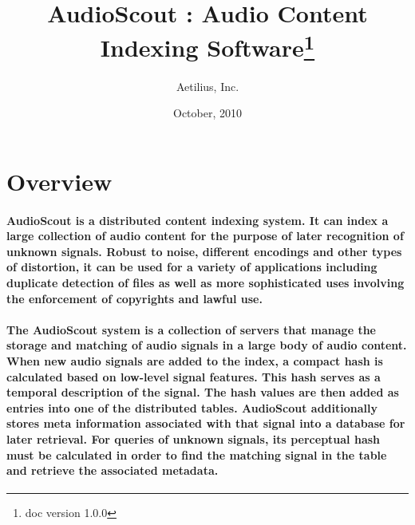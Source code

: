 \documentclass[11pt, a4paper]{article}
\title{AudioScout\texttrademark{} : Audio Content Indexing Software\footnote{doc version 1.0.0}}
\author{Aetilius, Inc.}
\date{October, 2010}
\begin{document}
\maketitle

\section{Overview}
\paragraph{AudioScout\texttrademark{} is a distributed content indexing system. It can index a
large collection of audio content for the purpose of later recognition of unknown signals. 
Robust to noise, different encodings and other types of distortion, it can be used 
for a variety of applications including duplicate detection of files as well as more sophisticated  
uses involving the enforcement of copyrights and lawful use.}    

\paragraph{The AudioScout\texttrademark{} system is a collection of servers that manage the storage and matching of 
audio signals in a large body of audio content.  When new audio signals are added 
to the index, a compact hash is calculated based on low-level signal features.  This hash  serves as a temporal description of 
the signal.  The hash values are then  added as entries into one of the distributed tables.  AudioScout additionally stores 
meta  information associated with that signal into a database for later retrieval.  For queries of unknown signals, its 
perceptual  hash  must be calculated in order to find the matching signal in the table and retrieve the associated metadata.}
 
\end{document}
